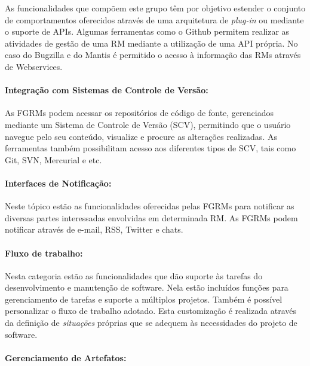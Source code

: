 As funcionalidades que compõem este grupo têm por objetivo estender o conjunto
de comportamentos oferecidos através de uma arquitetura de \textit{plug-in} ou
mediante o suporte de APIs. Algumas ferramentas como o Github permitem realizar
as atividades de gestão de uma RM mediante a utilização de uma API própria. No
caso do Bugzilla e do Mantis é permitido o acesso à informação das RMs através
de Webservices.

\paragraph{Integração com Sistemas de Controle de Versão:}
\label{par:integração_com_sistemas_de_controle_de_versão}

As FGRMs podem acessar os repositórios de código de fonte, gerenciados mediante
um Sistema de Controle de Versão (SCV), permitindo que o usuário navegue pelo
seu conteúdo, visualize e procure as alterações realizadas. As ferramentas
também possibilitam acesso aos diferentes tipos de SCV, tais como Git, SVN,
Mercurial e etc.

\paragraph{Interfaces de Notificação:}
\label{par:interfaces_de_notificação}

Neste tópico estão as funcionalidades oferecidas pelas FGRMs para notificar as
diversas partes interessadas envolvidas em determinada RM\@. As FGRMs podem
notificar através de e-mail, RSS, Twitter e chats.

\paragraph{Fluxo de trabalho:}
\label{par:fluxo_de_trabalho}

Nesta categoria estão as funcionalidades que dão suporte às tarefas do
desenvolvimento e manutenção de software. Nela estão incluídos funções para
gerenciamento de tarefas e suporte a múltiplos projetos. Também é possível
personalizar o fluxo de trabalho adotado. Esta customização é realizada através
da definição de \textit{situações} próprias que se adequem às necessidades do
projeto de software.

\paragraph{Gerenciamento de Artefatos:}
\label{par:gerenciamento_de_artefatos}

